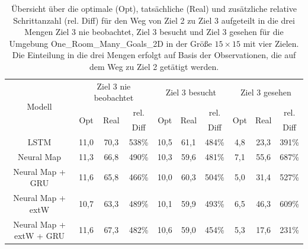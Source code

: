 \begin{table}
  \begin{tabular}{|c|c|c|c|c|c|c|c|c|c|}
    \hline
    \multirow{3}{*}{Modell} & \multicolumn{3}{|c|}{Ziel 3 nie beobachtet} & \multicolumn{3}{|c|}{Ziel 3 besucht} & \multicolumn{3}{|c|}{Ziel 3 gesehen} \\ \cline{2-10}
    & \multirow{2}{*}{Opt} & \multirow{2}{*}{Real} & rel. & \multirow{2}{*}{Opt} & \multirow{2}{*}{Real} & rel. & \multirow{2}{*}{Opt} & \multirow{2}{*}{Real} & rel. \\
    & & & Diff & & & Diff & & & Diff \\ \hline
    LSTM & 11,0 & 70,3 & 538\% & 10,5 & 61,1 & 484\% & 4,8 & 23,3 & 391\% \\ \hline
    Neural Map & 11,3 & 66,8 & 490\% & 10,3 & 59,6 & 481\% & 7,1 & 55,6 & 687\% \\ \hline
    Neural Map + GRU & 11,6 & 65,8 & 466\% & 10,0 & 60,3 & 504\% & 5,0 & 31,4 & 527\% \\ \hline
    Neural Map + extW & 10,7 & 63,3 & 489\% & 10,1 & 59,9 & 493\% & 6,5 & 46,3 & 609\% \\ \hline
    Neural Map + extW + GRU & 11,6 & 67,3 & 482\% & 10,6 & 59,0 & 454\% & 5,3 & 17,6 & 231\% \\ \hline
  \end{tabular}
  \caption{Übersicht über die optimale (Opt), tatsächliche (Real) und zusätzliche relative Schrittanzahl (rel. Diff) für den Weg von Ziel 2 zu Ziel 3 aufgeteilt in die drei Mengen \glqq Ziel 3 nie beobachtet\grqq{}, \glqq Ziel 3 besucht\grqq{} und \glqq Ziel 3 gesehen\grqq{} für die Umgebung \glqq One\_Room\_Many\_Goals\_2D\grqq{} in der Größe $15 \times 15$ mit vier Zielen. Die Einteilung in die drei Mengen erfolgt auf Basis der Observationen, die auf dem Weg zu Ziel 2 getätigt werden.}
  \label{results15x15_2_to_3_per_M}
\end{table}


